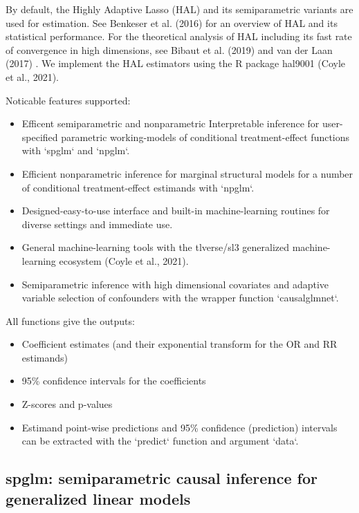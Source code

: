 \documentclass{article}
\begin{document}
By default, the Highly Adaptive Lasso (HAL) and its semiparametric variants are used for estimation. See Benkeser et al. (2016) for an overview of HAL and its statistical performance. For the theoretical analysis of HAL including its fast rate of convergence in high dimensions, see Bibaut et al. (2019) and van der Laan (2017) \nocite{bibaut2019fast}\nocite{HAL2016}\nocite{vanderlaanGenerlaTMLE}. We implement the HAL estimators using the R package hal9001 (Coyle et al., 2021).\nocite{hal1}\nocite{hal2} 
\nocite{vanderlaanGenerlaTMLE} 

Noticable features supported:
\begin{itemize}
\item Efficent semiparametric and nonparametric Interpretable inference for user-specified parametric working-models of conditional treatment-effect functions with `spglm` and `npglm`.
\item  Efficient nonparametric inference for marginal structural models for a number of conditional treatment-effect estimands with `npglm`.
\item Designed-easy-to-use interface and built-in machine-learning routines for diverse settings and immediate use.
\item  General machine-learning tools with the tlverse/sl3 generalized machine-learning ecosystem (Coyle et al., 2021).\nocite{coyle2021sl3}
\item  Semiparametric inference with high dimensional covariates and adaptive variable selection of confounders with the wrapper function `causalglmnet`.
\end{itemize}

All functions give the outputs: 
\begin{itemize}
\item Coefficient estimates (and their exponential transform for the OR and RR estimands)
\item 95\% confidence intervals for the coefficients
\item Z-scores and p-values
\item Estimand point-wise predictions and 95\% confidence (prediction) intervals can be extracted with the `predict` function and argument `data`.
\end{itemize}

\subsection{spglm: semiparametric causal inference for generalized linear models}
\end{document}
